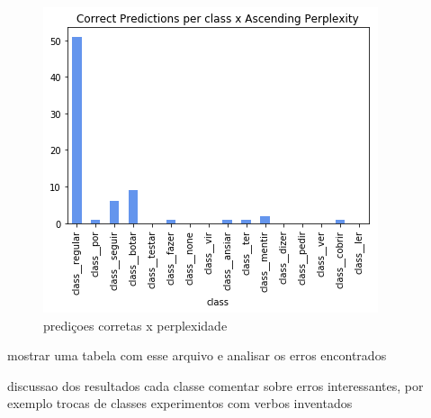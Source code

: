 \begin{figure}[H]
  \centering
  \includegraphics[width=0.7\linewidth]{img/best_file_accuracy_perplexity.png}
  \caption{prediçoes corretas x perplexidade}
  \label{fig:prexper}
\end{figure}


mostrar uma tabela com esse arquivo e analisar os erros encontrados

discussao dos resultados
cada classe
comentar sobre erros interessantes, por exemplo trocas de classes
experimentos com verbos inventados
